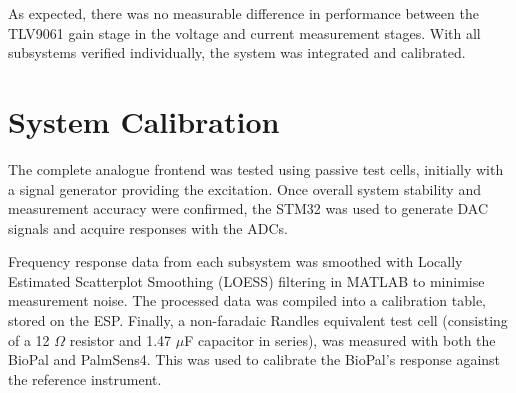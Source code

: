 As expected, there was no measurable difference in performance between the TLV9061 gain stage in the voltage and current measurement stages. With all subsystems verified individually, the system was integrated and calibrated.

\section{System Calibration}
The complete analogue frontend was tested using passive test cells, initially with a signal generator providing the excitation. Once overall system stability and measurement accuracy were confirmed, the STM32 was used to generate DAC signals and acquire responses with the ADCs.

Frequency response data from each subsystem was smoothed with Locally Estimated Scatterplot Smoothing (LOESS) filtering in MATLAB to minimise measurement noise. The processed data was compiled into a calibration table, stored on the ESP. Finally, a non-faradaic Randles equivalent test cell (consisting of a 12 $\Omega$ resistor and 1.47 $\mu$F capacitor in series), was measured with both the BioPal and PalmSens4. This was used to calibrate the BioPal's response against the reference instrument. 

